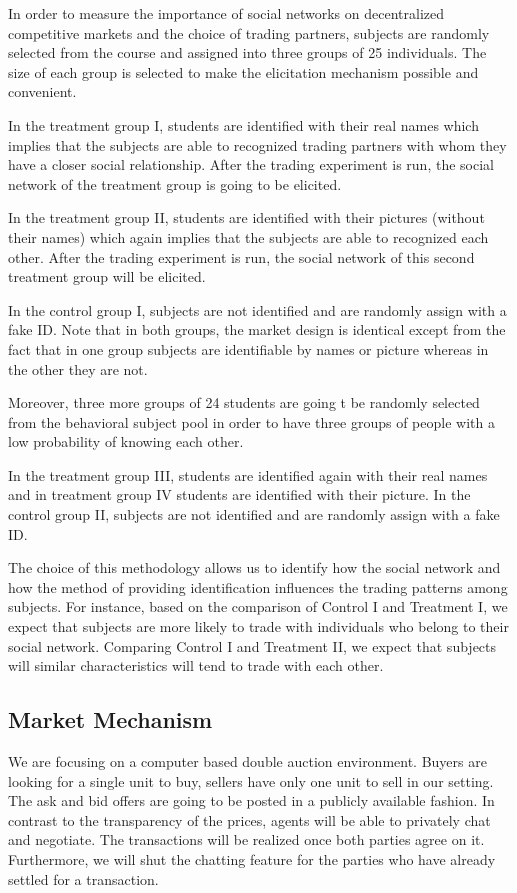 \documentclass{article}
\begin{document}
In order to measure the importance of social networks on decentralized
competitive markets and the choice of trading partners, subjects are randomly
selected from the course and assigned into three groups of 25 individuals. The
size of each group is selected to make the elicitation mechanism possible and convenient.

In the treatment group I, students are identified with their real names which
implies that the subjects are able to recognized trading partners with whom they
have a closer social relationship. After the trading experiment is run, the
social network of the treatment group is going to be elicited.

In the treatment group II, students are identified with their pictures (without their names) which again
implies that the subjects are able to recognized each other.  After the trading experiment is run, the
social network of this second treatment group will be elicited.

In the control
group I, subjects are not identified and are randomly assign with a fake ID. Note
that in both groups, the market design is identical except from the fact that in
one group subjects are identifiable by names or picture whereas in the other they are not.

Moreover, three more groups of 24 students are going t be randomly selected from the behavioral subject pool in order to have three groups of people with a low probability of knowing each other.

In the treatment group III, students are identified again with their real names and in treatment group IV students are identified with their picture. In the control
group II, subjects are not identified and are randomly assign with a fake ID.

The choice of this methodology allows us to identify how the social network
 and how the method of providing identification influences the trading patterns among subjects. For instance, based  on  the  comparison  of Control  I  and  Treatment  I,  we  expect  that  subjects  are  more  likely  to  trade with individuals who belong to their social network.  Comparing Control I and Treatment II, we expect that subjects will similar characteristics will tend to trade with each other.

\subsection{Market Mechanism}
We are focusing on a computer based double auction environment. Buyers are looking for a single unit to buy, sellers have only one unit to sell in our setting. The ask and bid
offers are going to be posted in a publicly available fashion. In contrast to
the transparency of the prices, agents will be able to privately chat and
negotiate. The transactions will be realized once both parties agree on it. Furthermore, we will shut the chatting feature for the parties who have already settled for a transaction. \\
\end{document}
